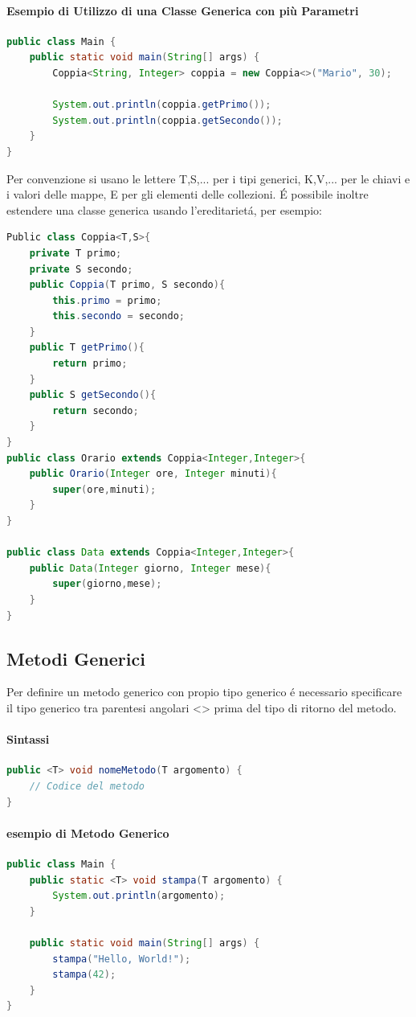 \documentclass[11pt]{article}
\begin{document}
\paragraph{Esempio di Utilizzo di una Classe Generica con più Parametri}
\begin{lstlisting}[language=Java]
public class Main {
    public static void main(String[] args) {
        Coppia<String, Integer> coppia = new Coppia<>("Mario", 30);

        System.out.println(coppia.getPrimo());
        System.out.println(coppia.getSecondo());
    }
}
\end{lstlisting}
Per convenzione si usano le lettere T,S,... per i tipi generici, K,V,... per le chiavi e i valori delle mappe, E per gli elementi delle collezioni.
É possibile inoltre estendere una classe generica usando l'ereditarietá, per esempio:
\begin{lstlisting}[language=Java]
Public class Coppia<T,S>{
    private T primo;
    private S secondo;
    public Coppia(T primo, S secondo){
        this.primo = primo;
        this.secondo = secondo;
    }
    public T getPrimo(){
        return primo;
    }
    public S getSecondo(){
        return secondo;
    }
}
public class Orario extends Coppia<Integer,Integer>{
    public Orario(Integer ore, Integer minuti){
        super(ore,minuti);
    }
}

public class Data extends Coppia<Integer,Integer>{
    public Data(Integer giorno, Integer mese){
        super(giorno,mese);
    }
}
\end{lstlisting}
\subsection{Metodi Generici}
Per definire un metodo generico con propio tipo generico é necessario specificare il tipo generico tra parentesi angolari <> prima del tipo di ritorno del metodo.
\paragraph{Sintassi}
\begin{lstlisting}[language=Java]
public <T> void nomeMetodo(T argomento) {
    // Codice del metodo
}
\end{lstlisting}
\paragraph{esempio di Metodo Generico}
\begin{lstlisting}[language=Java]
public class Main {
    public static <T> void stampa(T argomento) {
        System.out.println(argomento);
    }

    public static void main(String[] args) {
        stampa("Hello, World!");
        stampa(42);
    }
}
\end{lstlisting}
\end{document}
